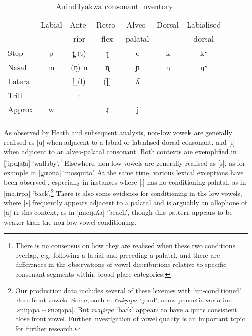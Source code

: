 \documentclass[output=paper,colorlinks,citecolor=brown]{langscibook}
\begin{document}
\begin{table}
\caption{Anindilyakwa consonant inventory}
\label{tab:mansfield:1}
\begin{tabular}{l *6{c}}
\lsptoprule
& Labial & Ante- & Retro- & Alveo- & Dorsal & Labialised \\
&        & rior  & flex   & palatal &       & dorsal\\
\midrule
Stop & p & t̪ (t) & ʈ & c & k & kʷ\\
Nasal & m & (n̪) n & ɳ & ɲ & ŋ & ŋʷ\\
Lateral &  & l̪ (l) & (ɭ) & ʎ & & \\
Trill &  & r &  &  &  & \\
Approx & w &  & ɻ & j &  & \\
\lspbottomrule
\end{tabular}
\end{table} 

As observed by Heath and subsequent analysts, non-low vowels are generally realised as [u] when adjacent to a labial or labialised dorsal consonant, and [i] when adjacent to an alveo-palatal consonant. Both contexts are exemplified in [jipuɻat̪a] ‘wallaby’.\footnote{There is no consensus on how they are realised when these two conditions overlap, e.g. following a labial and preceding a palatal, and there are differences in the observations of vowel distributions relative to specific consonant segments within broad place categories.} Elsewhere, non-low vowels are generally realised as [ə], as for example in [t̪ənəna] `mosquito'. At the same time, various lexical exceptions have been observed \citep{Stokes1981}, especially in instances where [i] has no conditioning palatal, as in [məɻirpa] ‘back’.\footnote{Our production data includes several of these lexemes with ‘un-conditioned’ close front vowels. Some, such as \textit{ɛniŋapa} ‘good’, show phonetic variation [ɛniŋapa {\textasciitilde} ɛnəŋapa]. But \textit{məɻirpa} ‘back’ appears to have a quite consistent close front vowel. Further investigation of vowel quality is an important topic for further research.} There is also some evidence for conditioning in the low vowels, where [ɛ] frequently appears adjacent to a palatal and is arguably an allophone of [a] in this context, as in [micijɛʎa] ‘beach’, though this pattern appears to be weaker than the non-low vowel conditioning.
\end{document}
